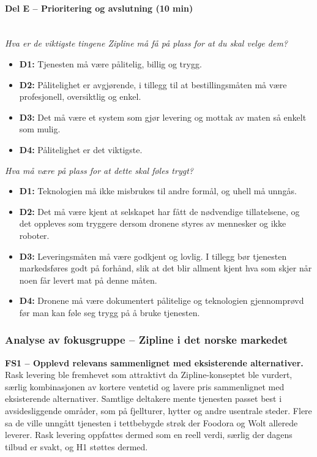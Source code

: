 \paragraph{Del E -- Prioritering og avslutning (10 min)}\mbox{}\\
\textit{Hva er de viktigste tingene Zipline må få på plass for at du skal
velge dem?}
\begin{itemize}[leftmargin=1.5em, nosep]
  \item \textbf{D1:} Tjenesten må være pålitelig, billig og trygg.
  \item \textbf{D2:} Pålitelighet er avgjørende, i tillegg til at
  bestillingsmåten må være profesjonell, oversiktlig og enkel.
  \item \textbf{D3:} Det må være et system som gjør levering og mottak av
  maten så enkelt som mulig.
  \item \textbf{D4:} Pålitelighet er det viktigste.
\end{itemize}

\textit{Hva må være på plass for at dette skal føles trygt?}
\begin{itemize}[leftmargin=1.5em, nosep]
  \item \textbf{D1:} Teknologien må ikke misbrukes til andre formål, og
  uhell må unngås.
  \item \textbf{D2:} Det må være kjent at selskapet har fått de nødvendige
  tillatelsene, og det oppleves som tryggere dersom dronene styres av
  mennesker og ikke roboter.
  \item \textbf{D3:} Leveringsmåten må være godkjent og lovlig. I tillegg
  bør tjenesten markedsføres godt på forhånd, slik at det blir allment kjent
  hva som skjer når noen får levert mat på denne måten.
  \item \textbf{D4:} Dronene må være dokumentert pålitelige og teknologien
  gjennomprøvd før man kan føle seg trygg på å bruke tjenesten.
\end{itemize}

\subsubsection*{Analyse av fokusgruppe -- Zipline i det norske markedet}

\textbf{FS1 -- Opplevd relevans sammenlignet med eksisterende alternativer.}
Rask levering ble fremhevet som attraktivt da Zipline-konseptet ble
vurdert, særlig kombinasjonen av kortere ventetid og lavere pris
sammenlignet med eksisterende alternativer. Samtlige deltakere mente
tjenesten passet best i avsidesliggende områder, som på fjellturer,
hytter og andre usentrale steder. Flere sa de ville unngått tjenesten i
tettbebygde strøk der Foodora og Wolt allerede leverer. Rask levering
oppfattes dermed som en reell verdi, særlig der dagens tilbud er svakt, og
H1 støttes dermed.

